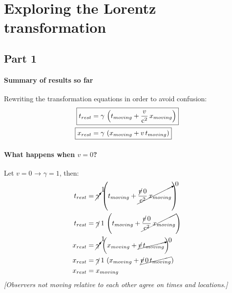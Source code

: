 \documentclass[pagesize,headsepline,10pt,parskip=half]{scrreprt}
\newcommand{\const}[1]{\ensuremath{\mathrm{#1}}}
\renewcommand{\c}{\const{c}}
\begin{document}
    \section{Exploring the Lorentz transformation}
      \subsection{Part 1}
        \paragraph{Summary of results so far}
          Rewriting the transformation equations in order to avoid confusion:
          \begin{align*}
            \Aboxed{t_{rest} &= \gamma \, \left(t_{moving} + \frac{v}{\c^2} \, x_{moving}\right)}\\
            \Aboxed{x_{rest} &= \gamma \, \left(x_{moving} + v \, t_{moving}\right)}
          \end{align*}

        \paragraph{What happens when $v = 0$?}
          \begin{samepage}
            Let $v = 0$ → $\gamma = 1$, then:
            \begin{align*}
              t_{rest} &= \cancelto{1}{\gamma} \, \left(t_{moving} + \cancelto{0}{\frac{\cancel{v} \, 0}{\c^2} \, x_{moving}}\right)\\
              t_{rest} &= \cancel{\gamma} \, 1 \, \left(t_{moving} + \cancel{\frac{\cancel{v} \, 0}{\c^2} \, x_{moving}}\right)\\
              x_{rest} &= \cancelto{1}{\gamma} \, \left(x_{moving} + \cancelto{0}{\cancel{v} \, t_{moving}}\right)\\
              x_{rest} &= \cancel{\gamma} \, 1 \, \left(x_{moving} + \cancel{\cancel{v} \,  0 \, t_{moving}}\right)\\
              x_{rest} &= x_{moving}
            \end{align*}
            \emph{[Observers not moving relative to each other agree on times and locations.]}
          \end{samepage}
\end{document}
